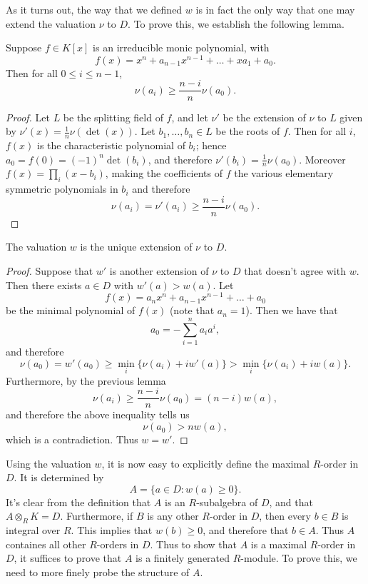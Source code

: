 As it turns out, the way that we defined $w$ is in fact the only way that one may extend the valuation $\nu$ to $D$.  To prove this, we establish the following lemma.
\begin{lem}
Suppose $f\in K[x]$ is an irreducible monic polynomial, with
$$f(x) = x^n + a_{n-1}x^{n-1} + \dots + xa_1 + a_0.$$
Then for all $0\leq i\leq n-1$,
$$\nu(a_i)\geq \frac{n-i}{n}\nu(a_0).$$
\end{lem}
\begin{proof}
Let $L$ be the splitting field of $f$, and let $\nu'$ be the extension of $\nu$ to $L$ given by $\nu'(x) = \frac{1}{n}\nu(\det(x))$.  Let $b_1,\dots,b_n\in L$ be the roots of $f$.  Then for all $i$, $f(x)$ is the characteristic polynomial of $b_i$; hence $a_0 = f(0) = (-1)^n\det(b_i)$, and therefore $\nu'(b_i) = \frac{1}{n}\nu(a_0)$.  Moreover $f(x) = \prod_i(x-b_i)$, making the coefficients of $f$ the various elementary symmetric polynomials in $b_i$ and therefore
$$\nu(a_i) = \nu'(a_i) \geq \frac{n-i}{n}\nu(a_0).$$
\end{proof}

\begin{cor}
The valuation $w$ is the unique extension of $\nu$ to $D$.
\end{cor}
\begin{proof}
Suppose that $w'$ is another extension of $\nu$ to $D$ that doesn't agree with $w$.  Then there exists $a\in D$ with $w'(a)>w(a)$.  Let
$$f(x) = a_nx^n + a_{n-1}x^{n-1} + \dots + a_0$$
be the minimal polynomial of $f(x)$ (note that $a_n = 1$).  Then we have that
$$a_0 = -\sum_{i=1}^{n}a_ia^i,$$
and therefore
$$\nu(a_0) = w'(a_0) \geq \min_i\{\nu(a_i) + iw'(a)\} > \min_i\{\nu(a_i) + iw(a)\}.$$
Furthermore, by the previous lemma
$$\nu(a_i)\geq \frac{n-i}{n}\nu(a_0) = (n-i)w(a),$$
and therefore the above inequality tells us
$$\nu(a_0) > nw(a),$$
which is a contradiction.  Thus $w = w'$.
\end{proof}

Using the valuation $w$, it is now easy to explicitly define the maximal $R$-order in $D$.  It is determined by
$$A = \{a\in D: w(a)\geq 0\}.$$
It's clear from the definition that $A$ is an $R$-subalgebra of $D$, and that $A\otimes_RK = D$.  Furthermore, if $B$ is any other $R$-order in $D$, then every $b\in B$ is integral over $R$.  This implies that $w(b)\geq 0$, and therefore that $b\in A$.  Thus $A$ containes all other $R$-orders in $D$.  Thus to show that $A$ is a maximal $R$-order in $D$, it suffices to prove that $A$ is a finitely generated $R$-module.  To prove this, we need to more finely probe the structure of $A$.

